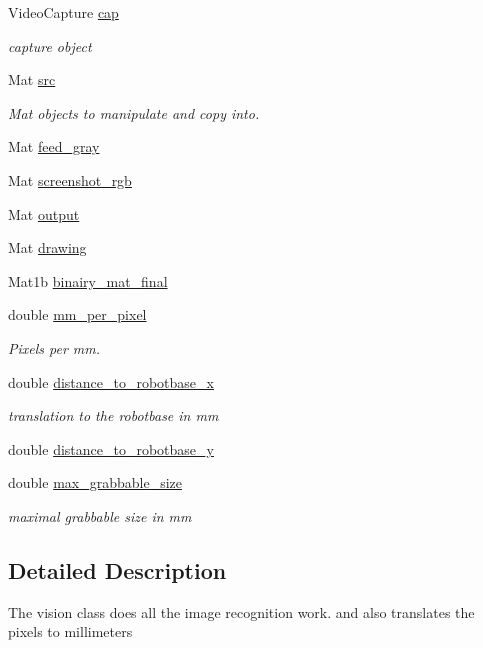 \begin{DoxyCompactItemize}
Video\+Capture \hyperlink{class_vision_a464b62371814a56a653a16641cbb80d2}{cap}
\begin{DoxyCompactList}\small\item\em capture object \end{DoxyCompactList}\item 
Mat \hyperlink{class_vision_a20dae61ff0f80e5d4bfb9042a9e268a9}{src}
\begin{DoxyCompactList}\small\item\em Mat objects to manipulate and copy into. \end{DoxyCompactList}\item 
Mat \hyperlink{class_vision_a8840c3a4be531ca9c80055d5aae6408b}{feed\+\_\+gray}
\item 
Mat \hyperlink{class_vision_ad8af9d726d385407fa2b5a58af014bb6}{screenshot\+\_\+rgb}
\item 
Mat \hyperlink{class_vision_af7343aec964f7367e29f3534c2a4e8a8}{output}
\item 
Mat \hyperlink{class_vision_a8b8b8f5c0bac3e7cad105ae44c794f8c}{drawing}
\item 
Mat1b \hyperlink{class_vision_a6509080d46e25f85776c843c08ef4f76}{binairy\+\_\+mat\+\_\+final}
\item 
double \hyperlink{class_vision_a8f96f153fed9e8805a471852ca66e92b}{mm\+\_\+per\+\_\+pixel}
\begin{DoxyCompactList}\small\item\em Pixels per mm. \end{DoxyCompactList}\item 
double \hyperlink{class_vision_a313acf0b614275c6adfcda8e20040837}{distance\+\_\+to\+\_\+robotbase\+\_\+x}
\begin{DoxyCompactList}\small\item\em translation to the robotbase in mm \end{DoxyCompactList}\item 
double \hyperlink{class_vision_a2d250c93ba3590a87bb19113cf4d25c1}{distance\+\_\+to\+\_\+robotbase\+\_\+y}
\item 
double \hyperlink{class_vision_af3643289d7252e6a3ad292f739c898a7}{max\+\_\+grabbable\+\_\+size}
\begin{DoxyCompactList}\small\item\em maximal grabbable size in mm \end{DoxyCompactList}\end{DoxyCompactItemize}


\subsection{Detailed Description}
The vision class does all the image recognition work. and also translates the pixels to millimeters 

